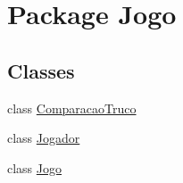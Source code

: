 \hypertarget{namespace_jogo}{
\section{Package Jogo}
\label{namespace_jogo}
}
\subsection*{Classes}
\begin{DoxyCompactItemize}
\item 
class \hyperlink{class_jogo_1_1_comparacao_truco}{ComparacaoTruco}
\item 
class \hyperlink{class_jogo_1_1_jogador}{Jogador}
\item 
class \hyperlink{class_jogo_1_1_jogo}{Jogo}
\end{DoxyCompactItemize}
